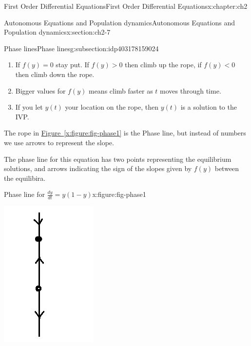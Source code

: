 \documentclass[oneside,10pt,]{book}
\newcommand{\xreffont}{\relax}
\numberwithin{equation}{section}
\numberwithin{equation}{section}
\newcommand{\lt}{<}
\begin{document}
\begin{chapterptx}{First Order Differential Equations}{}{First Order Differential Equations}{}{}{x:chapter:ch2}
\begin{sectionptx}{Autonomous Equations and Population dynamics}{}{Autonomous Equations and Population dynamics}{}{}{x:section:ch2-7}
\begin{subsectionptx}{Phase lines}{}{Phase lines}{}{}{g:subsection:idp403178159024}
\begin{enumerate}
\item{}If \(f(y)=0\) stay put. If \(f(y)>0\) then climb up the rope, if \(f(y)\lt 0\) then climb down the rope.%
\item{}Bigger values for \(f(y)\) means climb faster as \(t\) moves through time.%
\item{}If you let \(y(t)\) your location on the rope, then \(y(t)\) is a solution to the IVP.%
\end{enumerate}
%
\par
The rope in \hyperref[x:figure:fig-phase1]{Figure~{\xreffont\ref{x:figure:fig-phase1}}} is the Phase line, but instead of numbers we use arrows to represent the slope.%
\par
The phase line for this equation has two points representing the equilibrium solutions, and arrows indicating the sign of the slopes given by \(f(y)\) between the equilibira.%
\begin{figureptx}{Phase line for \(\frac{dy}{dt} = y(1-y)\)}{x:figure:fig-phase1}{}%
\begin{image}{0.35}{0.3}{0.35}%
\includegraphics[width=\linewidth]{images/1.6-Phase1.png}

\end{image}
\end{figureptx}
\end{subsectionptx}
\end{sectionptx}
\end{chapterptx}
\end{document}
